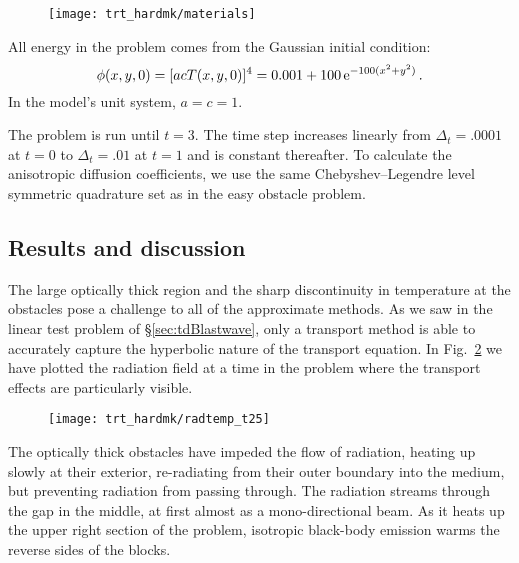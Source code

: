 \begin{figure}[htb]
  \centering
  \texttt{[image: trt\_hardmk/materials]}
  \label{fig:hardmkMaterials}
\end{figure}

All energy in the problem comes from the Gaussian initial condition:
\begin{equation*}
  \phi(x,y,0) = [ a c T(x,y,0)]^{4} = 0.001 + 100 \mathop{}\!\mathrm{e}^{-100 (x^2 + y^2) } \,.
\end{equation*}
In the model's unit system, $a=c=1$.

The problem is run until $t=3$. The time step increases linearly from $\Delta_t=.0001$ at
$t=0$ to $\Delta_t=.01$ at $t=1$ and is constant thereafter. To calculate the
anisotropic diffusion coefficients, we use the same Chebyshev--Legendre level
symmetric quadrature set as in the easy obstacle problem.

\subsection{Results and discussion}

The large optically thick region and the sharp discontinuity in temperature at
the obstacles pose a challenge to all of the approximate methods. As we saw in
the linear test problem of \S\ref{sec:tdBlastwave}, only a transport method is
able to accurately capture the hyperbolic nature of the transport equation. In
Fig.~\ref{fig:hardmkPseudocolor} we have plotted the radiation field at a time
in the problem where the transport effects are particularly visible.
%
\begin{figure}[htb]
  \centering
  \hspace{-1in}%
  \texttt{[image: trt\_hardmk/radtemp\_t25]}
  \label{fig:hardmkPseudocolor}
\end{figure}
%
The optically thick obstacles have impeded the flow of radiation, heating up
slowly at their exterior, re-radiating from their outer boundary into the
medium, but preventing radiation from passing through. The radiation streams
through the gap in the middle, at first almost as a mono-directional beam. As it
heats up the upper right section of the problem, isotropic black-body emission
warms the reverse sides of the blocks.

